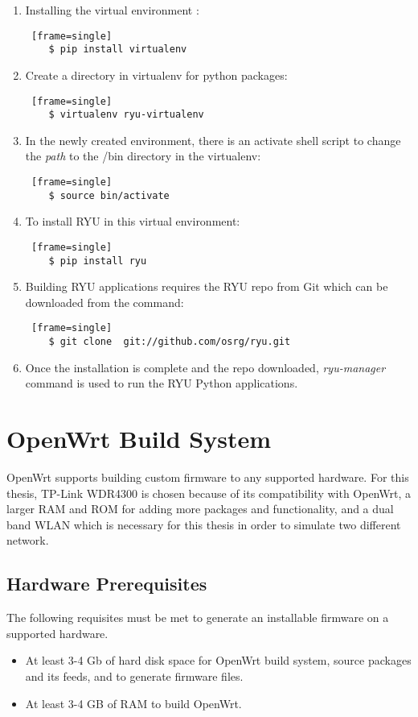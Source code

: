 \begin{enumerate}
	\item Installing the virtual environment :
	\begin{lstlisting} [frame=single]
	$ pip install virtualenv
	\end{lstlisting} 
	\item Create a directory in virtualenv for python packages: 
	\begin{lstlisting} [frame=single]
	$ virtualenv ryu-virtualenv
	\end{lstlisting}
	\item In the newly created environment, there is an activate shell script to change the \textit{path} to the /bin directory in the virtualenv: 
	\begin{lstlisting} [frame=single]
	$ source bin/activate
	\end{lstlisting}
	\item To install RYU in this virtual environment:
	\begin{lstlisting} [frame=single]
	$ pip install ryu
	\end{lstlisting}
	\item Building RYU applications requires the RYU repo from Git which can be downloaded from the command:
	\begin{lstlisting} [frame=single]
	$ git clone  git://github.com/osrg/ryu.git
	\end{lstlisting}
	\item Once the installation is complete and the repo downloaded, \textit{ryu-manager} command is used to run the RYU Python applications.
\end{enumerate}

\section{OpenWrt Build System \cite{OpenWrt_build_root}} \label{OpenWrt_build}
OpenWrt supports building custom firmware to any supported hardware. For this thesis, TP-Link WDR4300 is chosen because of its compatibility with OpenWrt, a larger RAM and ROM for adding more packages and functionality, and a dual band WLAN which is necessary for this thesis in order to simulate two different network.
\subsection{Hardware Prerequisites}
The following requisites must be met to generate an installable firmware on a supported hardware.
\begin{itemize}
	\item At least 3-4 Gb of hard disk space for OpenWrt build system, source packages and its feeds, and to generate firmware files.
	\item At least 3-4 GB of RAM to build OpenWrt.
\end{itemize}
